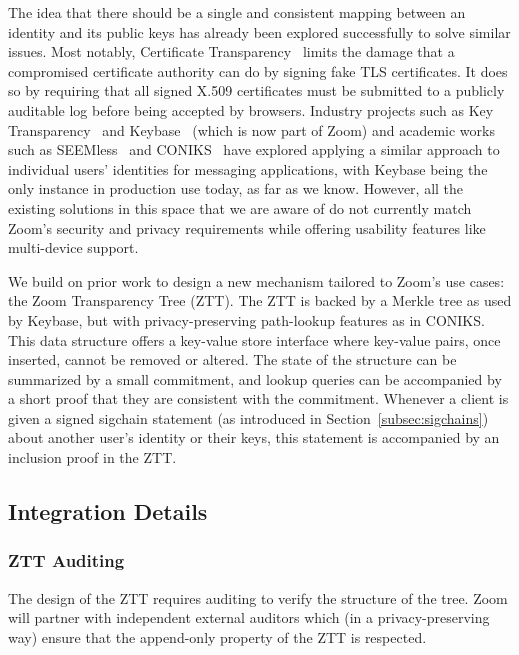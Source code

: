 The idea that there should be a single and consistent mapping between an identity and its public
keys has already been explored successfully to solve similar issues. Most notably, Certificate
Transparency~\cite{langley2013certificate} limits the damage that a compromised certificate
authority can do by signing fake TLS certificates. It does so by requiring that all signed X.509
certificates must be submitted to a publicly auditable log before being accepted by browsers.
Industry projects such as Key Transparency~\cite{keytransparency} and Keybase~\cite{keybase} (which
is now part of Zoom) and academic works such as SEEMless~\cite{chase2019seemless} and
CONIKS~\cite{melara2015coniks} have explored applying a similar approach to individual users'
identities for messaging applications, with Keybase being the only instance in production use today,
as far as we know. However, all the existing solutions in this space that we are aware of do not
currently match Zoom's security and privacy requirements while offering usability features like
multi-device support.

We build on prior work to design a new mechanism tailored to Zoom's use cases: the Zoom Transparency
Tree (ZTT). The ZTT is backed by a Merkle tree as used by Keybase, but with privacy-preserving
path-lookup features as in CONIKS. This data structure offers a key-value store interface where
key-value pairs, once inserted, cannot be removed or altered. The state of the structure can be
summarized by a small commitment, and lookup queries can be accompanied by a short proof that they
are consistent with the commitment. Whenever a client is given a signed sigchain statement (as
introduced in Section~\ref{subsec:sigchains}) about another user's identity or their keys, this
statement is accompanied by an inclusion proof in the ZTT.

\subsection{Integration Details}

\subsubsection{ZTT Auditing}\label{subsec:zttaudit}

The design of the ZTT requires auditing to verify the structure of the tree. Zoom will partner with
independent external auditors which (in a privacy-preserving way) ensure that the append-only
property of the ZTT is respected.

